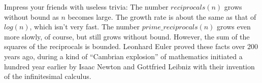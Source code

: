         Impress your friends with useless trivia:
        The number $reciprocals(n)$ grows without bound as $n$ becomes large.
        The growth rate is about the same as that of $log(n)$, which isn't very fast.
        The number $prime\_reciprocals(n)$ grows even more slowly, of course,
        but still grows without bound.
        However, the sum of the squares of the reciprocals is bounded.
        Leonhard Euler proved these facts over 200 years ago, during
        a kind of ``Cambrian explosion'' of mathematics initiated a hundred year earlier
        by Isaac Newton and Gottfried Leibniz with their invention of the infinitesimal calculus.

